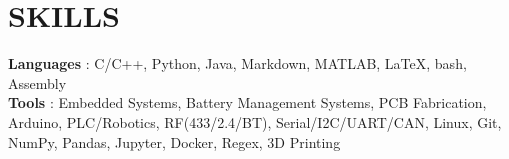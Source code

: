 \section{SKILLS}
\begin{itemize}[leftmargin=0in, label={}]
    \small{\item{
                    \textbf{Languages} {: C/C++, Python, Java, Markdown, MATLAB, \LaTeX, bash, Assembly }\vspace{2pt} \\
                    \textbf{Tools} {: Embedded Systems, Battery Management Systems, PCB Fabrication, Arduino, PLC/Robotics, RF(433/2.4/BT), Serial/I2C/UART/CAN, Linux, Git, NumPy, Pandas, Jupyter, Docker, Regex, 3D Printing}              }}
\end{itemize}